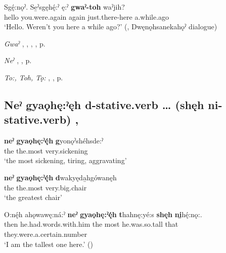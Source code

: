 \ea
\label{ex:npar27}
\gll Sgę́:nǫˀ. Se̱ˀsgęhę́:ˀ ę:ˀ \textbf{gwaˀ-toh} waˀjih?\\
hello you.were.again again just.there-here a.while.ago\\
\glt ‘Hello. Weren’t you here a while ago?’ (\cite[441]{mithun_watewayestanih_1984}, Dwęnǫhsanekahǫˀ dialogue)
\z

\begin{CayugaRelated}
\item \textit{Gwaˀ} , , , , p. \pageref{p:[gwaˀ] ‘immediately’}\\
\item \textit{Neˀ} , , p. \pageref{p:[neˀ]}\\
\item \textit{To:, Toh, Tǫ:} , , p. \pageref{p:[to:] ‘there’, ‘that place’}
\end{CayugaRelated}

\subsection*{\textbf{Neˀ gyaǫhę:ˀęh d-stative.verb … (shęh ni-stative.verb)} , } \label{p:[neˀ gyaǫhę:ˀęh d-]}

\ea
\label{ex:npar1110}
\gll \textbf{neˀ} \textbf{gyaǫhę:ˀę́h} \textbf{g}yonǫˀshéhsde:ˀ\\
the the.most very.sickening\\
\glt ‘the most sickening, tiring, aggravating’
\z

\ea
\label{ex:npar1112}
\gll \textbf{neˀ} \textbf{gyaǫhę:ˀę́h} \textbf{d}wakyęda̱hgówanęh\\
the the.most very.big.chair\\
\glt ‘the greatest chair’
\z

\ea
\label{ex:npar1130}
\gll O:nę́h ahǫwawę:ná:ˀ \textbf{neˀ} \textbf{gyaǫhę:ˀę́h} \textbf{t}hahnę:yé:s \textbf{shęh} \textbf{ni̱}hę́:nǫ:.\\
then he.had.words.with.him the most he.was.so.tall that they.were.a.certain.number\\
\glt ‘I am the tallest one here.’ (\cite{carrier_legends_2013})
\z

